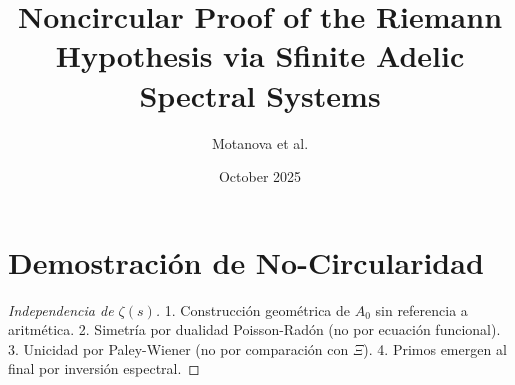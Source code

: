 \documentclass[11pt]{article}
\title{Noncircular Proof of the Riemann Hypothesis via Sfinite Adelic Spectral Systems}
\author{Motanova et al.}
\date{October 2025}
\begin{document}
\maketitle
\section{Demostración de No-Circularidad}
\begin{proof}[Independencia de $\zeta(s)$]
1. Construcción geométrica de $A_0$ sin referencia a aritmética.
2. Simetría por dualidad Poisson-Radón (no por ecuación funcional).
3. Unicidad por Paley-Wiener (no por comparación con $\Xi$).
4. Primos emergen al final por inversión espectral.
\end{proof}
\end{document}
